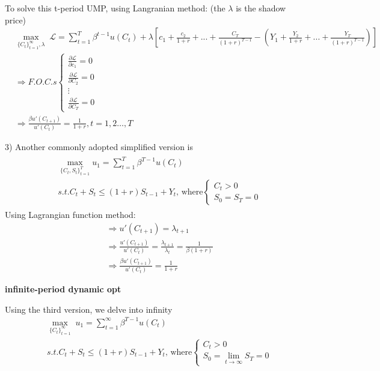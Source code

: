\documentclass{article}
\begin{document}
To solve this t-period UMP, using Langranian method: (the $\lambda$ is the shadow price)
\begin{align}
&\mathop{max}_{\{C_{t}\}^{\infty}_{t=1},\lambda} \; \mathscr{L}=\sum\limits_{t=1}^{T}\beta^{t-1}u(C_{t})+\lambda[c_{1}+\frac{c_{2}}{1+r}+...+\frac{C_{T}}{(1+r)^{T-1}}-(Y_{1}+\frac{Y_{2}}{1+r}+...+\frac{Y_{T}}{(1+r)^{T-1}}) ]
\\&\Rightarrow F.O.C.s \begin{cases}\frac{\partial  \mathscr{L}}{\partial  c_{1}}=0 \\
\frac{\partial  \mathscr{L}}{\partial  C_{2}}=0 \\
\vdots \\
\frac{\partial  \mathscr{L}}{\partial  C_{T}}=0
\end{cases} 
\\&\Rightarrow \frac{\beta u'(C_{t+1})}{u'(C_t)}=\frac{1}{1+r}, t=1,2\dots,T
\end{align}

3) Another commonly adopted simplified version is
\begin{align}
\begin{split}
&\mathop{max}\limits_{\{C_{t},S_{t}\}_{t=1}^{T}} u_{1}=\sum\limits_{t=1}^{T}\beta^{T-1}u(C_{t})
\\&s.t. C_{t}+S_{t}\leqslant (1+r)S_{t-1}+Y_{t} \text{, where} \begin{cases}
C_{t}>0 \\
S_{0}=S_{T}=0
\end{cases}
\end{split}
\end{align}
Using Lagrangian function method:
\begin{align}
&\Rightarrow u'(C_{t+1})=\lambda_{t+1}
\\&\Rightarrow \frac{u'(C_{t+1})}{u'(C_{t})}=\frac{\lambda_{t+1}}{\lambda_{t}}=\frac{1}{\beta(1+r)}
\\&\Rightarrow \frac{\beta u'(C_{t+1})}{u'(C_t)}=\frac{1}{1+r}
\end{align}

\textbf{infinite-period dynamic opt} 

Using the third version, we delve into infinity
\begin{equation}
\begin{split}
&\mathop{max}_{\{C_{t}\}_{t=1}^{\infty}}\; u_{1}=\sum\limits_{t=1}^{\infty}\beta^{T-1}u(C_{t})
\\&s.t. C_{t}+S_{t}\leqslant (1+r)S_{t-1}+Y_{t} \text{, where} 
\begin{cases}
C_{t}>0 \\
S_{0}=\lim\limits_{t \rightarrow \infty} S_{T}=0
\end{cases}
\end{split}
\end{equation}
\end{document}

